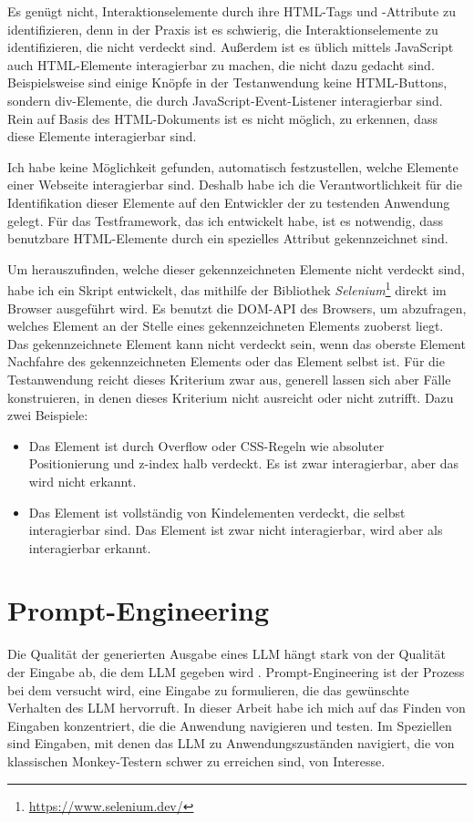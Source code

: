 Es genügt nicht, Interaktionselemente durch ihre HTML-Tags und -Attribute zu identifizieren, denn in der Praxis ist es schwierig, die Interaktionselemente zu identifizieren, die nicht verdeckt sind.
Außerdem ist es üblich mittels JavaScript auch HTML-Elemente interagierbar zu machen, die nicht dazu gedacht sind.
Beispielsweise sind einige Knöpfe in der Testanwendung keine HTML-Buttons, sondern div-Elemente, die durch JavaScript-Event-Listener interagierbar sind.
Rein auf Basis des HTML-Dokuments ist es nicht möglich, zu erkennen, dass diese Elemente interagierbar sind.

Ich habe keine Möglichkeit gefunden, automatisch festzustellen, welche Elemente einer Webseite interagierbar sind.
Deshalb habe ich die Verantwortlichkeit für die Identifikation dieser Elemente auf den Entwickler der zu testenden Anwendung gelegt.
Für das Testframework, das ich entwickelt habe, ist es notwendig, dass benutzbare HTML-Elemente durch ein spezielles Attribut gekennzeichnet sind.

Um herauszufinden, welche dieser gekennzeichneten Elemente nicht verdeckt sind, habe ich ein Skript entwickelt, das mithilfe der Bibliothek \textit{Selenium}\footnote{\url{https://www.selenium.dev/}} direkt im Browser ausgeführt wird.
Es benutzt die DOM-API des Browsers, um abzufragen, welches Element an der Stelle eines gekennzeichneten Elements zuoberst liegt.
Das gekennzeichnete Element kann nicht verdeckt sein, wenn das oberste Element Nachfahre des gekennzeichneten Elements oder das Element selbst ist.
Für die Testanwendung reicht dieses Kriterium zwar aus, generell lassen sich aber Fälle konstruieren, in denen dieses Kriterium nicht ausreicht oder nicht zutrifft.
Dazu zwei Beispiele:
\begin{itemize}
    \item Das Element ist durch Overflow oder CSS-Regeln wie absoluter Positionierung und z-index halb verdeckt. Es ist zwar interagierbar, aber das wird nicht erkannt.
    \item Das Element ist vollständig von Kindelementen verdeckt, die selbst interagierbar sind. Das Element ist zwar nicht interagierbar, wird aber als interagierbar erkannt.
\end{itemize}

\section{Prompt-Engineering}
\label{sec:prompt-engineering}

Die Qualität der generierten Ausgabe eines LLM hängt stark von der Qualität der Eingabe ab, die dem LLM gegeben wird \cite{chain-of-thought}.
Prompt-Engineering ist der Prozess bei dem versucht wird, eine Eingabe zu formulieren, die das gewünschte Verhalten des LLM hervorruft.
In dieser Arbeit habe ich mich auf das Finden von Eingaben konzentriert, die die Anwendung navigieren und testen.
Im Speziellen sind Eingaben, mit denen das LLM zu Anwendungszuständen navigiert, die von klassischen Monkey-Testern schwer zu erreichen sind, von Interesse.


